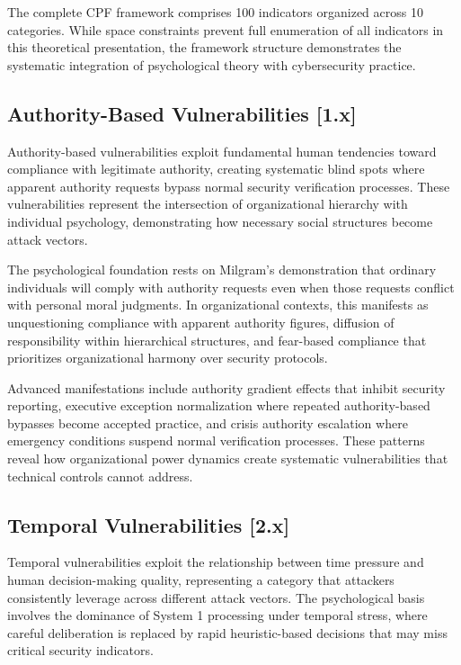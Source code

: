 \documentclass[11pt,a4paper]{article}
\begin{document}
The complete CPF framework comprises 100 indicators organized across 10 categories. While space constraints prevent full enumeration of all indicators in this theoretical presentation, the framework structure demonstrates the systematic integration of psychological theory with cybersecurity practice.

\subsection{Authority-Based Vulnerabilities [1.x]}

Authority-based vulnerabilities exploit fundamental human tendencies toward compliance with legitimate authority, creating systematic blind spots where apparent authority requests bypass normal security verification processes. These vulnerabilities represent the intersection of organizational hierarchy with individual psychology, demonstrating how necessary social structures become attack vectors.

The psychological foundation rests on Milgram's demonstration that ordinary individuals will comply with authority requests even when those requests conflict with personal moral judgments. In organizational contexts, this manifests as unquestioning compliance with apparent authority figures, diffusion of responsibility within hierarchical structures, and fear-based compliance that prioritizes organizational harmony over security protocols.

Advanced manifestations include authority gradient effects that inhibit security reporting, executive exception normalization where repeated authority-based bypasses become accepted practice, and crisis authority escalation where emergency conditions suspend normal verification processes. These patterns reveal how organizational power dynamics create systematic vulnerabilities that technical controls cannot address.

\subsection{Temporal Vulnerabilities [2.x]}

Temporal vulnerabilities exploit the relationship between time pressure and human decision-making quality, representing a category that attackers consistently leverage across different attack vectors. The psychological basis involves the dominance of System 1 processing under temporal stress, where careful deliberation is replaced by rapid heuristic-based decisions that may miss critical security indicators.
\end{document}
